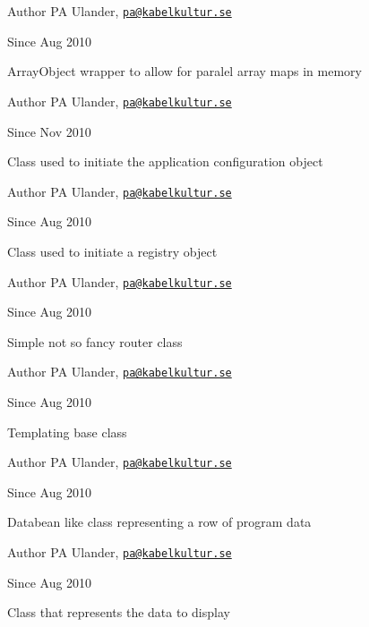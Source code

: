 \begin{DoxyAuthor}{Author}
P\-A Ulander, \href{mailto:pa@kabelkultur.se}{\tt pa@kabelkultur.\-se} 
\end{DoxyAuthor}
\begin{DoxySince}{Since}
Aug 2010
\end{DoxySince}
Array\-Object wrapper to allow for paralel array maps in memory

\begin{DoxyAuthor}{Author}
P\-A Ulander, \href{mailto:pa@kabelkultur.se}{\tt pa@kabelkultur.\-se} 
\end{DoxyAuthor}
\begin{DoxySince}{Since}
Nov 2010
\end{DoxySince}
Class used to initiate the application configuration object

\begin{DoxyAuthor}{Author}
P\-A Ulander, \href{mailto:pa@kabelkultur.se}{\tt pa@kabelkultur.\-se} 
\end{DoxyAuthor}
\begin{DoxySince}{Since}
Aug 2010
\end{DoxySince}
Class used to initiate a registry object

\begin{DoxyAuthor}{Author}
P\-A Ulander, \href{mailto:pa@kabelkultur.se}{\tt pa@kabelkultur.\-se} 
\end{DoxyAuthor}
\begin{DoxySince}{Since}
Aug 2010
\end{DoxySince}
Simple not so fancy router class

\begin{DoxyAuthor}{Author}
P\-A Ulander, \href{mailto:pa@kabelkultur.se}{\tt pa@kabelkultur.\-se} 
\end{DoxyAuthor}
\begin{DoxySince}{Since}
Aug 2010
\end{DoxySince}
Templating base class

\begin{DoxyAuthor}{Author}
P\-A Ulander, \href{mailto:pa@kabelkultur.se}{\tt pa@kabelkultur.\-se} 
\end{DoxyAuthor}
\begin{DoxySince}{Since}
Aug 2010
\end{DoxySince}
Databean like class representing a row of program data

\begin{DoxyAuthor}{Author}
P\-A Ulander, \href{mailto:pa@kabelkultur.se}{\tt pa@kabelkultur.\-se} 
\end{DoxyAuthor}
\begin{DoxySince}{Since}
Aug 2010
\end{DoxySince}
Class that represents the data to display

